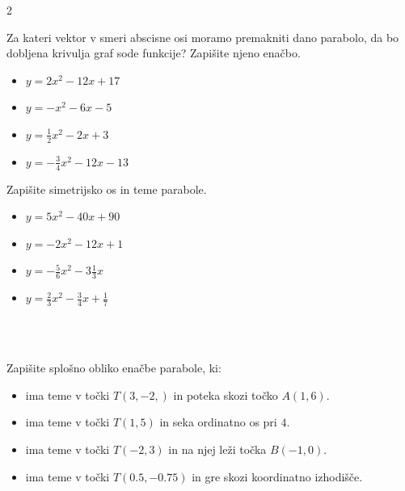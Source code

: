         \begin{multicols}{2}
            
        \begin{naloga}
            Za kateri vektor v smeri abscisne osi moramo premakniti dano parabolo, da bo dobljena krivulja graf sode funkcije?
            Zapišite njeno enačbo.

                \begin{itemize}
                    \item $ y=2x^2-12x+17 $ 
                    \item $ y=-x^2-6x-5 $ 
                    \item $ y=\frac{1}{2}x^2-2x+3 $ 
                    \item $ y=-\frac{3}{4}x^2-12x-13 $
                \end{itemize}

        \end{naloga}
    


    
            \begin{naloga}
                Zapišite simetrijsko os in teme parabole.
                
                    \begin{itemize}
                        \item $ y=5x^2-40x+90 $ 
                        \item $ y=-2x^2-12x+1 $ 
                        \item $ y=-\frac{5}{6}x^2-3\frac{1}{3}x $ 
                        \item $ y=\frac{2}{3}x^2-\frac{3}{4}x+\frac{1}{7} $ 
                    \end{itemize}

            \end{naloga}

            ~\\~

        \end{multicols}


        \begin{naloga}
                Zapišite splošno obliko enačbe parabole, ki:
                
                    \begin{itemize}
                        \item ima teme v točki $T(3,-2,)$ in poteka skozi točko $A(1,6)$.
                        \item ima teme v točki $T(1,5)$ in seka ordinatno os pri $4$.
                        \item ima teme v točki $T(-2,3)$ in na njej leži točka $B(-1,0)$.
                        \item ima teme v točki $T(0.5,-0.75)$ in gre skozi koordinatno izhodišče.
                    \end{itemize}

            \end{naloga}

